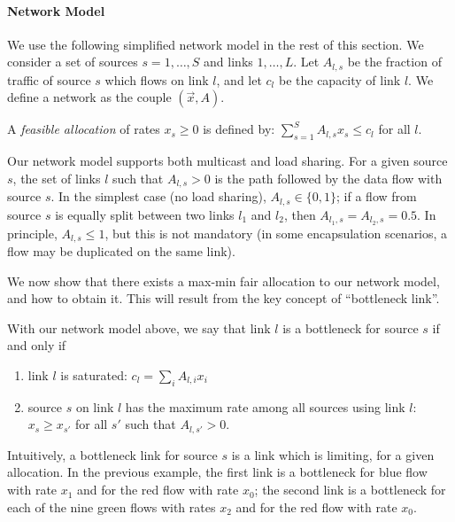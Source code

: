 \paragraph{Network Model}

We use the following simplified network model in the rest of
this section. We consider a set of sources $s=1, \ldots, S$
and links $1,\ldots,L$. Let $A_{l,s}$ be the fraction of
traffic of source $s$ which flows on link $l$, and let $c_{l}$
be the capacity of link $l$. We define a network as the couple
$(\vec{x}, A)$.

A \emph{feasible allocation} of rates $x_{s}\geq 0$ is defined
by: $\sum_{s=1}^{S}A_{l,s}x_{s} \leq c_{l}$ for all $l$.

Our network model supports both multicast and load sharing.
For a given source $s$, the set of links $l$ such that
$A_{l,s} > 0$ is the path followed by the data flow with
source $s$. In the simplest case (no load sharing), $A_{l,s}
\in \{0, 1\}$; if a flow from source $s$ is equally split
between two links $l_{1}$ and $l_{2}$, then $A_{l_{1},s} =
A_{l_{2},s} =0.5$. In principle, $A_{l,s} \leq 1$, but this is
not mandatory (in some encapsulation scenarios, a flow may be
duplicated on the same link).




We now show that there exists a
max-min fair allocation to our network model, and how to
obtain it. This will result from the key concept of
``bottleneck link''.

\begin{definition}
        With our network model above, we say that link $l$ is a bottleneck
        for source $s$ if and only if
        \begin{enumerate}
                \item  link $l$ is saturated: $c_{l}= \sum_{i}A_{l,i}x_{i}$

                \item  source $s$ on link $l$ has the maximum rate among all
                sources using link $l$:
                $x_{s}\geq x_{s'}$ for all $s'$ such that $A_{l,s'} > 0$.
        \end{enumerate}
\end{definition}

Intuitively, a bottleneck link for source $s$ is a link which
is limiting, for a given allocation.  In the previous
example, the first link is a bottleneck for blue flow with rate $x_1$ and for the red flow with rate $x_0$; the second link is a bottleneck for each of the nine green flows with rates $x_2$ and for the red flow with rate $x_0$.

